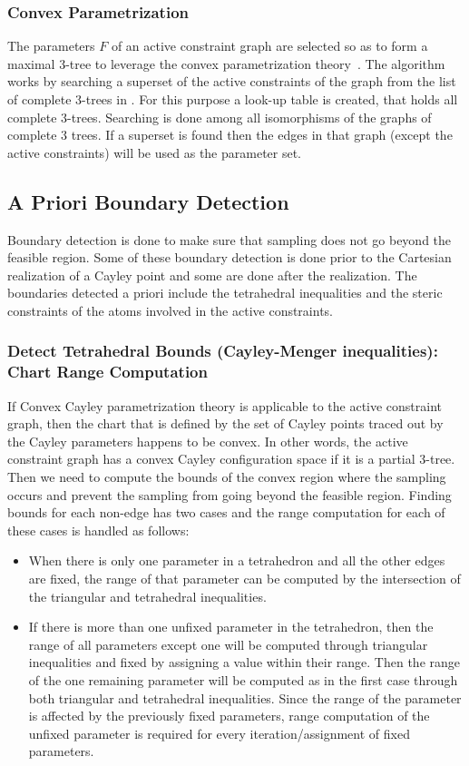 \subsubsection{Convex Parametrization}
The parameters $F$ of an active constraint graph are selected so as to form a maximal
3-tree to leverage the convex parametrization
theory~\cite{Gao}. The algorithm works by searching a superset of the active
constraints of the graph from the list of complete 3-trees in
. For this purpose a look-up table is created, that holds
all complete 3-trees. Searching is done among all isomorphisms of the graphs of
complete 3 trees. If a superset is found then the edges in that graph (except
the active constraints) will be used as the parameter set.

\subsection{A Priori Boundary Detection}
Boundary detection is done to make sure that sampling does not go beyond the feasible
region. Some of these boundary detection is done prior to the Cartesian realization
of a Cayley point and some are done after the realization. The boundaries detected
a priori include the tetrahedral inequalities and the steric constraints of the
atoms involved in the active constraints.


\subsubsection{Detect Tetrahedral Bounds (Cayley-Menger inequalities): Chart Range Computation}
If Convex Cayley parametrization theory is
applicable to the active constraint graph, then the chart that is defined by
the set of Cayley points traced out by the Cayley parameters happens to be
convex. In other words, the active constraint graph has a convex Cayley
configuration space if it is a partial 3-tree. Then we need to compute the
bounds of the convex region where the sampling occurs and prevent the sampling
from going beyond the feasible region. Finding bounds for each non-edge has two cases
and the range computation for each of these cases is handled as follows:
\begin{itemize}
		\item When there is only one parameter in a tetrahedron and all the
				other edges are fixed, the range of that parameter can be
				computed by the intersection of the triangular and tetrahedral
				inequalities.
		\item If there is more than one unfixed parameter in the tetrahedron,
				then the range of all parameters except one will be computed
				through triangular inequalities and fixed by assigning a value
				within their range. Then the range of the one remaining
				parameter will be computed as in the first case through both
				triangular and tetrahedral inequalities. Since the range of
				the parameter is affected by the previously fixed parameters,
				range computation of the unfixed parameter is required
				for every iteration/assignment of fixed parameters.
\end{itemize}

